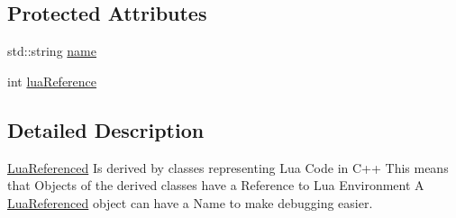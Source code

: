 \subsection*{Protected Attributes}
\begin{DoxyCompactItemize}
\item 
std\+::string \hyperlink{classZeta_1_1LuaReferenced_ad6f7a947b37382f9968f4a54bd718119}{name}
\item 
int \hyperlink{classZeta_1_1LuaReferenced_a1b8fa758a5b30071d7b8fb0280d164a4}{lua\+Reference}
\end{DoxyCompactItemize}


\subsection{Detailed Description}
\hyperlink{classZeta_1_1LuaReferenced}{Lua\+Referenced} Is derived by classes representing Lua Code in C++ This means that Objects of the derived classes have a Reference to Lua Environment A \hyperlink{classZeta_1_1LuaReferenced}{Lua\+Referenced} object can have a Name to make debugging easier. 

